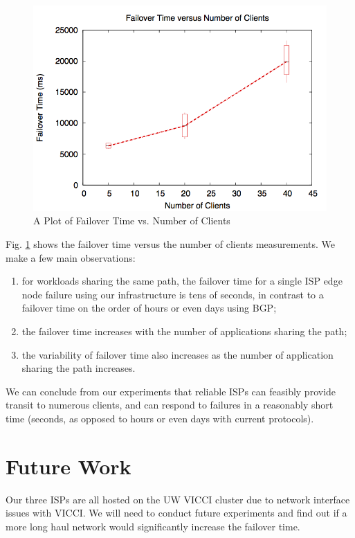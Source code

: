 \documentclass{article}
\begin{document}
\begin{figure}
\includegraphics[width=\linewidth]{failoverTime_numClients}
\caption{A Plot of Failover Time vs. Number of Clients}
\label{fig:failover}
\end{figure}

Fig. \ref{fig:failover} shows the failover time versus the number of clients
measurements. We make a few main observations:
\begin{enumerate}
\item for workloads sharing the same path, the failover time for a
  single ISP edge node failure using our infrastructure is tens of
  seconds, in contrast to a failover time on the order of hours or
  even days using BGP;
\item the failover time increases with the number of applications
  sharing the path;
\item the variability of failover time also increases as the number of
  application sharing the path increases.
\end{enumerate}

We can conclude from our experiments that reliable ISPs can feasibly
provide transit to numerous clients, and can respond to failures in a
reasonably short time (seconds, as opposed to hours or even days with
current protocols).

\section{Future Work}

Our three ISPs are all hosted on the UW VICCI cluster due to network
interface issues with VICCI. We will need to conduct future
experiments and find out if a more long haul network would
significantly increase the failover time.
\end{document}

